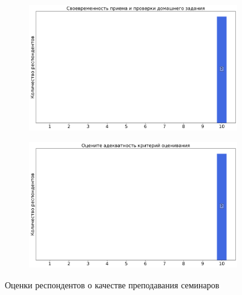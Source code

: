 \begin{figure}[H]
\begin{subfigure}[b]{0.45\textwidth}
                \includegraphics[width=\textwidth]{images/2 course/Компьютерные технологии/seminarists-marks-Ефанов Н.Н.-2.png}
            \end{subfigure}
            \begin{subfigure}[b]{0.45\textwidth}
                \centering
                \includegraphics[width=\textwidth]{images/2 course/Компьютерные технологии/seminarists-marks-Ефанов Н.Н.-3.png}
            \end{subfigure}	
            \caption{Оценки респондентов о качестве преподавания семинаров}
        \end{figure}


        
